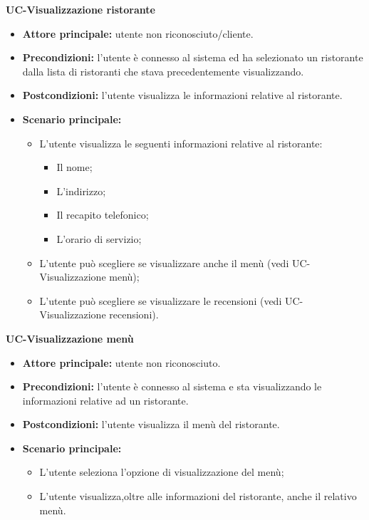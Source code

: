 \textbf{UC-Visualizzazione ristorante}
\begin{itemize}
\item \textbf{Attore principale:} utente non riconosciuto/cliente.
\item \textbf{Precondizioni:} l'utente è connesso al sistema ed ha selezionato un ristorante
dalla lista di ristoranti che stava precedentemente visualizzando.
\item \textbf{Postcondizioni:} l'utente visualizza le informazioni relative al ristorante.
\item \textbf{Scenario principale:}
\begin{itemize}
    \item L'utente visualizza le seguenti informazioni relative al ristorante:
    \begin{itemize}
        \item Il nome;
        \item L'indirizzo;
        \item Il recapito telefonico;
        \item L'orario di servizio;
    \end{itemize}
    \item L'utente può scegliere se visualizzare anche il menù (vedi UC-Visualizzazione menù);
    \item L'utente può scegliere se visualizzare le recensioni (vedi UC-Visualizzazione recensioni).
\end{itemize}
\end{itemize}

\textbf{UC-Visualizzazione menù}
\begin{itemize}
\item \textbf{Attore principale:} utente non riconosciuto.
\item \textbf{Precondizioni:} l'utente è connesso al sistema e sta visualizzando
le informazioni relative ad un ristorante.
\item \textbf{Postcondizioni:} l'utente visualizza il menù del ristorante.
\item \textbf{Scenario principale:}
\begin{itemize}
    \item L'utente seleziona l'opzione di visualizzazione del menù;
    \item L'utente visualizza,oltre alle informazioni del ristorante, anche il relativo menù.
\end{itemize}
\end{itemize}

